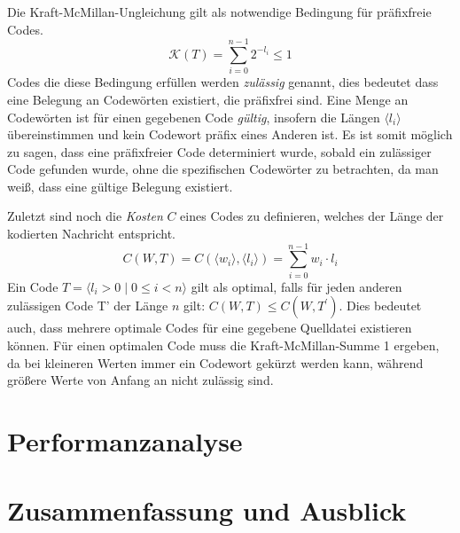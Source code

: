 \documentclass[course=erap]{aspdoc}
\begin{document}
Die Kraft-McMillan-Ungleichung gilt als notwendige Bedingung für präfixfreie Codes.
$$\mathcal{K}(T) = \sum_{i=0}^{n-1} 2^{-l_i} \le 1$$
Codes die diese Bedingung erfüllen werden \textit{zulässig} genannt, dies bedeutet dass eine Belegung an Codewörten existiert, die präfixfrei sind.
Eine Menge an Codewörten ist für einen gegebenen Code \textit{gültig}, insofern die Längen $\langle l_i \rangle$ übereinstimmen und kein Codewort präfix eines Anderen ist.
Es ist somit möglich zu sagen, dass eine präfixfreier Code determiniert wurde, sobald ein zulässiger Code gefunden wurde, ohne die spezifischen Codewörter zu betrachten, da man weiß, dass eine gültige Belegung existiert.

Zuletzt sind noch die \textit{Kosten} $C$ eines Codes zu definieren, welches der Länge der kodierten Nachricht entspricht.
$$C(W,T) = C(\langle w_i \rangle,\langle l_i \rangle) = \sum_{i=0}^{n-1} w_i \cdot l_i $$
Ein Code $T = \langle l_i > 0 \mid 0 \le i < n \rangle$ gilt als optimal, falls für jeden anderen zulässigen Code T' der Länge $n$ gilt: $C(W,T) \le C(W,T^{\prime})$. Dies bedeutet auch, dass mehrere optimale Codes für eine gegebene Quelldatei existieren können.
Für einen optimalen Code muss die Kraft-McMillan-Summe 1 ergeben, da bei kleineren Werten immer ein Codewort gekürzt werden kann, während größere Werte von Anfang an nicht zulässig sind.

\section{Performanzanalyse}


\section{Zusammenfassung und Ausblick}


{}
\end{document}
